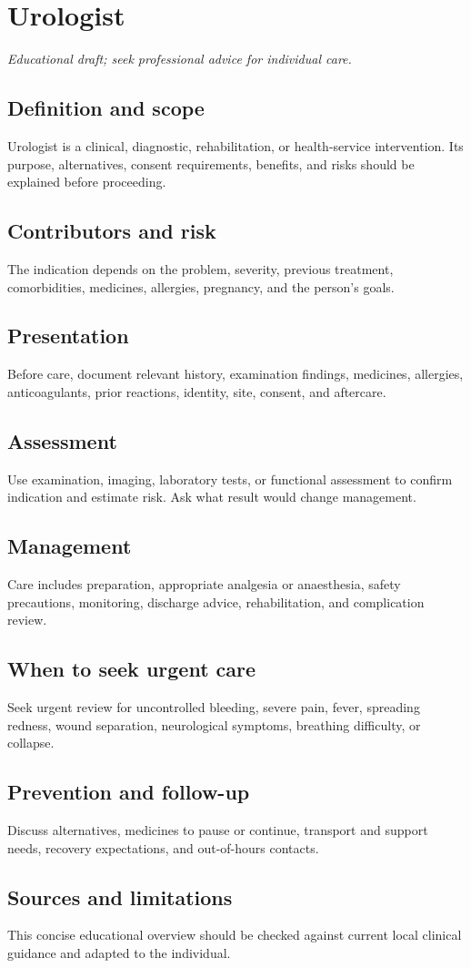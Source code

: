 \chapter{Urologist}
\medskip
\noindent\textit{Educational draft; seek professional advice for individual care.}

\section*{Definition and scope}
Urologist is a clinical, diagnostic, rehabilitation, or health-service intervention. Its purpose, alternatives, consent requirements, benefits, and risks should be explained before proceeding.

\section*{Contributors and risk}
The indication depends on the problem, severity, previous treatment, comorbidities, medicines, allergies, pregnancy, and the person’s goals.

\section*{Presentation}
Before care, document relevant history, examination findings, medicines, allergies, anticoagulants, prior reactions, identity, site, consent, and aftercare.

\section*{Assessment}
Use examination, imaging, laboratory tests, or functional assessment to confirm indication and estimate risk. Ask what result would change management.

\section*{Management}
Care includes preparation, appropriate analgesia or anaesthesia, safety precautions, monitoring, discharge advice, rehabilitation, and complication review.

\section*{When to seek urgent care}
Seek urgent review for uncontrolled bleeding, severe pain, fever, spreading redness, wound separation, neurological symptoms, breathing difficulty, or collapse.

\section*{Prevention and follow-up}
Discuss alternatives, medicines to pause or continue, transport and support needs, recovery expectations, and out-of-hours contacts.

\section*{Sources and limitations}
This concise educational overview should be checked against current local clinical guidance and adapted to the individual.
